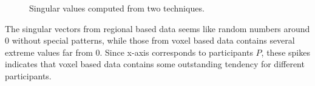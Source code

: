 \documentclass{article}[12pt]
\begin{document}
\begin{figure} [h!] \centering
{}
\hskip 1pt

\caption{Singular values computed from two techniques.}
\end{figure}


The singular vectors from regional based data seems like random numbers around 0 without special patterns, while those from voxel based data contains several extreme values far from 0. Since x-axis corresponds to participants $P$, these spikes indicates that voxel based data contains some outstanding tendency for different participants. 
\end{document}
